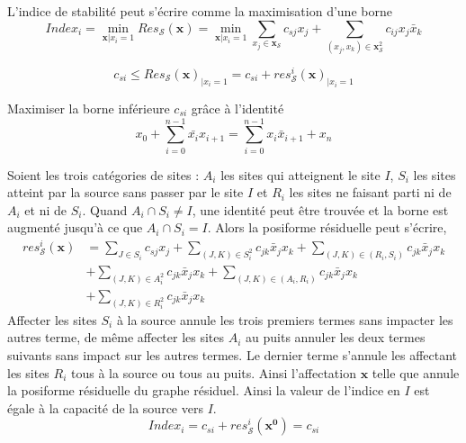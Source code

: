 \documentclass[../main/These_Mathias_Paget.tex]{subfiles}
\begin{document}
L'indice de stabilité peut s'écrire comme la maximisation d'une borne
\begin{equation}
Index_i = \min_{\boldsymbol{x} | x_i=1}{Res_\mathcal{S}(\boldsymbol{x})} = \min_{\boldsymbol{x} | x_i=1}{\sum_{x_j \in \boldsymbol{x}_\mathcal{S}}{c_{sj}x_j} + \sum_{(x_j,x_k) \in \boldsymbol{x}^{2}_\mathcal{S}}{c_{ij}x_j\bar{x}_k}}
\end{equation}

\begin{equation}
	c_{si} \leq  {Res_\mathcal{S}(\boldsymbol{x})}_{|x_i=1} = c_{si} +  {res^{i}_\mathcal{S}(\boldsymbol{x})}_{|x_i=1}
\end{equation}

Maximiser la borne inférieure $c_{si}$ grâce à l'identité 
\begin{equation}
x_0 + \sum_{i=0}^{n-1} \bar{x_i}x_{i+1} = \sum_{i=0}^{n-1} x_i\bar{x}_{i+1} + x_n
\end{equation}

Soient les trois catégories de sites : $A_i$ les sites qui atteignent le site $I$, $S_i$ les sites atteint par la source sans passer par le site $I$ et $R_i$ les sites ne faisant parti ni de $A_i$ et ni de $S_i$. Quand $ A_i \cap S_i \neq I$, une identité peut être trouvée et la borne est augmenté jusqu'à ce que $A_i \cap S_i = I$. Alors la posiforme résiduelle peut s'écrire,
\begin{equation}
\begin{aligned}
{res^{i}_\mathcal{S}(\boldsymbol{x})} &= \sum_{J \in S_i} c_{sj}x_j +  \sum_{(J,K) \in S^2_i} c_{jk}\bar{x}_jx_k + \sum_{(J,K) \in (R_i,S_i)} c_{jk}\bar{x}_jx_k \\ &+ \sum_{(J,K) \in A^2_i} c_{jk}\bar{x}_jx_k + \sum_{(J,K) \in (A_i,R_i)} c_{jk}\bar{x}_jx_k \\ & + \sum_{(J,K) \in R^2_i} c_{jk}\bar{x}_jx_k
\end{aligned}
\end{equation}
Affecter les sites $S_i$ à la source annule les trois premiers termes sans impacter les autres terme, de même affecter les sites $A_i$ au puits annuler les deux termes suivants sans impact sur les autres termes. Le dernier terme s'annule les affectant les sites $R_i$  tous à la source ou tous au puits. Ainsi l'affectation $\boldsymbol{x}$ telle que
annule la posiforme résiduelle du graphe résiduel. Ainsi la valeur de l'indice en $I$ est égale à la capacité de la source vers $I$.
\begin{equation}
Index_i = c_{si} + res^{i}_\mathcal{S}(\boldsymbol{x^0}) = c_{si}
\end{equation}
\end{document}

